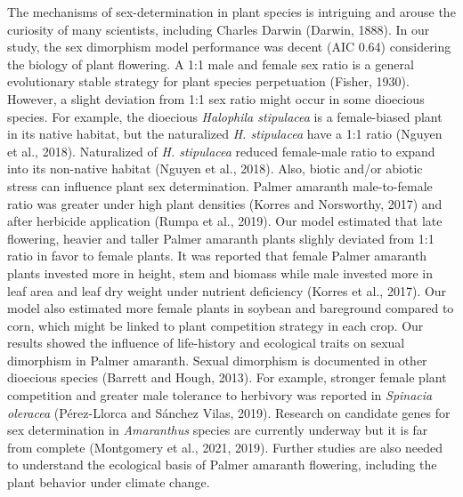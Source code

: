 \documentclass[utf8]{frontiersSCNS}
\begin{document}
The mechanisms of sex-determination in plant species is intriguing and
arouse the curiosity of many scientists, including Charles Darwin
(Darwin, 1888). In our study, the sex dimorphism model performance was
decent (AIC 0.64) considering the biology of plant flowering. A 1:1 male
and female sex ratio is a general evolutionary stable strategy for plant
species perpetuation (Fisher, 1930). However, a slight deviation from
1:1 sex ratio might occur in some dioecious species. For example, the
dioecious \emph{Halophila stipulacea} is a female-biased plant in its
native habitat, but the naturalized \emph{H. stipulacea} have a 1:1
ratio (Nguyen et al., 2018). Naturalized of \emph{H. stipulacea} reduced
female-male ratio to expand into its non-native habitat (Nguyen et al.,
2018). Also, biotic and/or abiotic stress can influence plant sex
determination. Palmer amaranth male-to-female ratio was greater under
high plant densities (Korres and Norsworthy, 2017) and after herbicide
application (Rumpa et al., 2019). Our model estimated that late
flowering, heavier and taller Palmer amaranth plants slighly deviated
from 1:1 ratio in favor to female plants. It was reported that female
Palmer amaranth plants invested more in height, stem and biomass while
male invested more in leaf area and leaf dry weight under nutrient
deficiency (Korres et al., 2017). Our model also estimated more female
plants in soybean and bareground compared to corn, which might be linked
to plant competition strategy in each crop. Our results showed the
influence of life-history and ecological traits on sexual dimorphism in
Palmer amaranth. Sexual dimorphism is documented in other dioecious
species (Barrett and Hough, 2013). For example, stronger female plant
competition and greater male tolerance to herbivory was reported in
\emph{Spinacia oleracea} (Pérez-Llorca and Sánchez Vilas, 2019).
Research on candidate genes for sex determination in \emph{Amaranthus}
species are currently underway but it is far from complete (Montgomery
et al., 2021, 2019). Further studies are also needed to understand the
ecological basis of Palmer amaranth flowering, including the plant
behavior under climate change.
\end{document}
